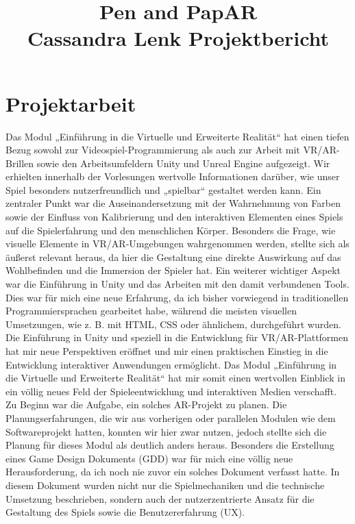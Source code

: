 \documentclass[11pt]{article}
\begin{document}
    \title{Pen and PapAR \\ \large \textminus Cassandra Lenk Projektbericht \textminus}

    \maketitle

    \section{Projektarbeit}\label{sec:chapter_projectwork_clenk}

    Das Modul „Einführung in die Virtuelle und Erweiterte Realität“ hat einen tiefen Bezug sowohl zur Videospiel-Programmierung als auch zur Arbeit mit VR/AR-Brillen sowie den Arbeitsumfeldern Unity und Unreal Engine aufgezeigt. Wir erhielten innerhalb der Vorlesungen wertvolle Informationen darüber, wie unser Spiel besonders nutzerfreundlich und „spielbar“ gestaltet werden kann. Ein zentraler Punkt war die Auseinandersetzung mit der Wahrnehmung von Farben sowie der Einfluss von Kalibrierung und den interaktiven Elementen eines Spiels auf die Spielerfahrung und den menschlichen Körper. Besonders die Frage, wie visuelle Elemente in VR/AR-Umgebungen wahrgenommen werden, stellte sich als äußerst relevant heraus, da hier die Gestaltung eine direkte Auswirkung auf das Wohlbefinden und die Immersion der Spieler hat.
    Ein weiterer wichtiger Aspekt war die Einführung in Unity und das Arbeiten mit den damit verbundenen Tools. Dies war für mich eine neue Erfahrung, da ich bisher vorwiegend in traditionellen Programmiersprachen gearbeitet habe, während die meisten visuellen Umsetzungen, wie z. B. mit HTML, CSS oder ähnlichem, durchgeführt wurden. Die Einführung in Unity und speziell in die Entwicklung für VR/AR-Plattformen hat mir neue Perspektiven eröffnet und mir einen praktischen Einstieg in die Entwicklung interaktiver Anwendungen ermöglicht.
    Das Modul „Einführung in die Virtuelle und Erweiterte Realität“ hat mir somit einen wertvollen Einblick in ein völlig neues Feld der Spieleentwicklung und interaktiven Medien verschafft. Zu Beginn war die Aufgabe, ein solches AR-Projekt zu planen. Die Planungserfahrungen, die wir aus vorherigen oder parallelen Modulen wie dem Softwareprojekt hatten, konnten wir hier zwar nutzen, jedoch stellte sich die Planung für dieses Modul als deutlich anders heraus. Besonders die Erstellung eines Game Design Dokuments (GDD) war für mich eine völlig neue Herausforderung, da ich noch nie zuvor ein solches Dokument verfasst hatte. In diesem Dokument wurden nicht nur die Spielmechaniken und die technische Umsetzung beschrieben, sondern auch der nutzerzentrierte Ansatz für die Gestaltung des Spiels sowie die Benutzererfahrung (UX).
\end{document}
